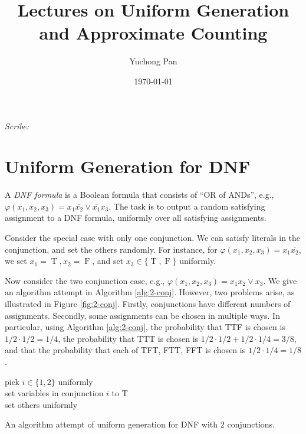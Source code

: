 \documentclass[letterpaper, reqno,11pt]{article}
\DeclareMathOperator{\T}{T}
\DeclareMathOperator{\F}{F}
\begin{document}
\title{Lectures on Uniform Generation and Approximate Counting}
\author{Yuchong Pan}
\date{\today}
\newtheorem{theorem}{Theorem}
\newtheorem{lemma}[theorem]{Lemma}
\newtheorem{proposition}[theorem]{Proposition}
\newtheorem{corollary}[theorem]{Corollary}
\newtheorem{fact}[theorem]{Fact}
\newtheorem{claim}{Claim}
\newtheorem{exercise}{Exercise}
\theoremstyle{definition}
\newtheorem{definition}[theorem]{Definition}
%

\begin{framed}
 \hfill \thedate
\begin{center}
\Large{\thetitle}
\end{center}
 \hfill {\em Scribe: \theauthor}
\end{framed}

\section{Uniform Generation for DNF}

A \emph{DNF formula} is a Boolean formula that consists of ``OR of ANDs'', e.g., $\varphi(x_1, x_2, x_3) = x_1 \overline{x_2} \vee \overline{x_1} x_3$. The task is to output a random satisfying assignment to a DNF formula, uniformly over all satisfying assignments.

Consider the special case with only one conjunction. We can satisfy literals in the conjunction, and set the others randomly. For instance, for $\varphi(x_1, x_2, x_3) = x_1 \overline{x_2}$, we set $x_1 = \T, x_2 = \F$, and set $x_3 \in \{ \T, \F \}$ uniformly.

Now consider the two conjunction case, e.g., $\varphi(x_1, x_2, x_3) = x_1 x_2 \vee x_3$. We give an algorithm attempt in Algorithm \ref{alg:2-conj}. However, two problems arise, as illustrated in Figure \ref{fig:2-conj}. Firstly, conjunctions have different numbers of assignments. Secondly, some assignments can be chosen in multiple ways. In particular, using Algorithm \ref{alg:2-conj}, the probability that TTF is chosen is $1/2 \cdot 1/2 = 1/4$, the probability that TTT is chosen is $1/2 \cdot 1/2 + 1/2 \cdot 1/4 = 3/8$, and that the probability that each of TFT, FTT, FFT is chosen is $1/2 \cdot 1/4 = 1/8$.

\begin{algorithm}
  pick $i \in \{ 1, 2 \}$ uniformly \\
  set variables in conjunction $i$ to T \label{line:conj} \\
  set others uniformly
  \caption{An algorithm attempt of uniform generation for DNF with 2 conjunctions.}
  \label{alg:2-conj}
\end{algorithm}
\end{document}
